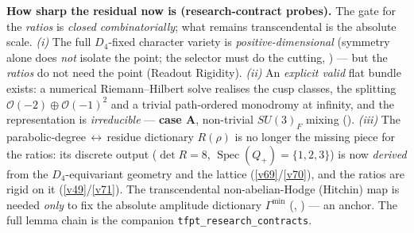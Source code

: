 \smallskip
\noindent\textbf{How sharp the residual now is (research-contract probes).} The gate for the \emph{ratios} is
\emph{closed combinatorially}; what remains transcendental is the absolute scale. \emph{(i)} The full
$D_4$-fixed character variety is \emph{positive-dimensional} (symmetry alone does \emph{not} isolate the
point; the selector must do the cutting, ) --- but the \emph{ratios} do
not need the point (Readout Rigidity). \emph{(ii)} An \emph{explicit valid} flat bundle exists: a numerical
Riemann--Hilbert solve realises the cusp classes, the splitting $\mathcal O(-2)\oplus\mathcal O(-1)^2$ and a
trivial path-ordered monodromy at infinity, and the representation is \emph{irreducible} ---
\textbf{case A}, non-trivial $SU(3)_F$ mixing (). \emph{(iii)} The
parabolic-degree\,$\leftrightarrow$\,residue dictionary $R(\rho)$ is no longer the missing piece for the
ratios: its discrete output ($\det R=8$, $\operatorname{Spec}(Q_+)=\{1,2,3\}$) is now \emph{derived} from the
$D_4$-equivariant geometry and the lattice (\vref{v69}/\vref{v70}), and the ratios are rigid on it (\vref{v49}/\vref{v71}). The
transcendental non-abelian-Hodge (Hitchin) map is needed \emph{only} to fix the absolute amplitude dictionary
$\Gamma^{\min}$ (, ) --- an anchor. The full
lemma chain is the companion \texttt{tfpt\_research\_contracts}.


